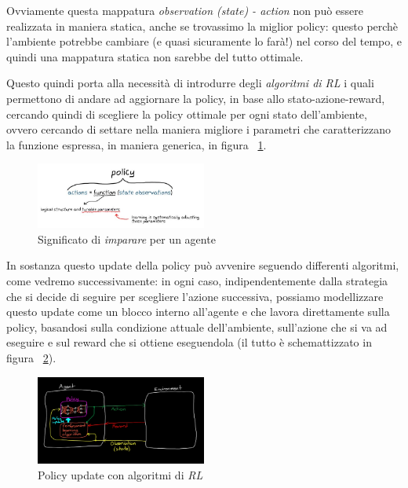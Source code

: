 Ovviamente questa mappatura \textit{observation (state) - action} non può essere realizzata in maniera statica, anche se trovassimo la miglior policy: questo perchè l'ambiente potrebbe cambiare (e quasi sicuramente lo farà!) nel corso del tempo, e quindi una mappatura statica non sarebbe del tutto ottimale.

Questo quindi porta alla necessità di introdurre degli \textit{ algoritmi di RL} i quali permettono di andare ad aggiornare la policy, in base allo stato-azione-reward, cercando quindi di scegliere la policy ottimale per ogni stato dell'ambiente, ovvero cercando di settare nella maniera migliore i parametri che caratterizzano la funzione espressa, in maniera generica, in figura ~\ref{fig:PolicyFunction}.

\begin{figure}[!h]
	\centering
	\includegraphics[width=0.5\textwidth]{Immagini/PolicyLearning.JPG}
	\caption{Significato di \textit{imparare} per un agente}
	\label{fig:PolicyFunction}
\end{figure}

\newpage

In sostanza questo update della policy può avvenire seguendo differenti algoritmi, come vedremo successivamente: in ogni caso, indipendentemente dalla strategia che si decide di seguire per scegliere l'azione successiva, possiamo modellizzare questo update come un blocco interno all'agente e che lavora direttamente sulla policy, basandosi sulla condizione attuale dell'ambiente, sull'azione che si va ad eseguire e sul reward che si ottiene eseguendola (il tutto è schemattizzato in figura ~\ref{fig:Policy_update}).

\begin{figure}[!h]
	\centering
	\includegraphics[width=0.5\textwidth]{Immagini/Policy_update.png}
	\caption{Policy update con algoritmi di \textit{RL}}
	\label{fig:Policy_update}
\end{figure}


